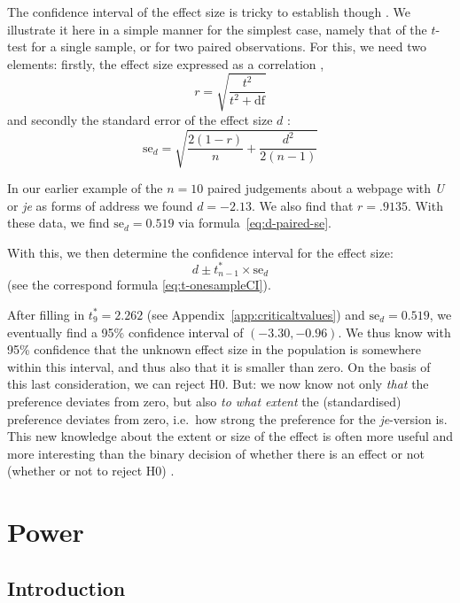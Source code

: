 \documentclass[
]{book}
\begin{document}
The confidence interval of the effect size is tricky to establish though
\citep{Naka07, Chen15}. We illustrate it here in a simple manner for
the simplest case, namely that of the \(t\)-test for a single sample,
or for two paired observations. For this, we need two elements:
firstly, the effect size expressed as a correlation \citep[ p.359, formula 12.1]{Rose08}, \[r = \sqrt{ \frac{t^2}{t^2+\textrm{df}} }\] and secondly
the standard error of the effect size \(d\) \citep[ p.600,
formula 18]{Naka07}:\\
\begin{equation}
  \label{eq:d-paired-se}
    \textrm{se}_d = \sqrt{ \frac{2(1-r)}{n} + \frac{d^2}{2(n-1)} }
\end{equation}

In
our earlier example of the \(n=10\) paired judgements about a webpage
with \emph{U} or \emph{je} as forms of address we found \(d=-2.13\). We also find
that \(r=.9135\). With these data, we find \(\textrm{se}_d = 0.519\) via
formula~\eqref{eq:d-paired-se}.

With this, we then determine the confidence interval for the
effect size:
\begin{equation}
   \label{eq:d-paired-CI}
    d \pm t^*_{n-1} \times \textrm{se}_d 
\end{equation}
(see the correspond
formula \eqref{eq:t-onesampleCI}).

After filling in \(t^*_9=2.262\) (see
Appendix~\ref{app:criticaltvalues}) and
\(\textrm{se}_d = 0.519\), we eventually find
a 95\% confidence interval of \((-3.30,-0.96)\). We thus
know with 95\% confidence that the unknown effect size in the population
is somewhere within this interval, and thus also that it is smaller than
zero. On the basis of this last consideration, we can reject H0.
But: we now know not only \emph{that} the preference deviates from zero, but
also \emph{to what extent} the (standardised) preference deviates from zero,
i.e.~how strong the preference for the \emph{je}-version is. This new knowledge
about the extent or size of the effect is often more useful and more interesting
than the binary decision of whether there is an effect or not (whether or not
to reject H0) \citep{Cumm12}.

\hypertarget{ch:power}{%
\chapter{Power}\label{ch:power}}

\hypertarget{sec:power-introduction}{%
\section{Introduction}\label{sec:power-introduction}}
\end{document}
